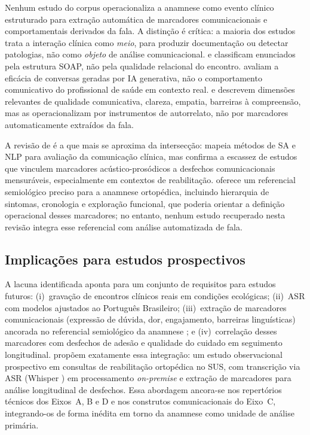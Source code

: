 \documentclass[a4paper,fleqn]{cas-sc}
\begin{document}
Nenhum estudo do corpus operacionaliza a anamnese como evento clínico
estruturado para extração automática de marcadores comunicacionais e
comportamentais derivados da fala.
A distinção é crítica: a maioria dos estudos trata a interação clínica como
\emph{meio}, para produzir documentação ou detectar patologias, não como
\emph{objeto} de análise comunicacional.
\citet{Krishna2021} e
\citet{Schloss2020} classificam enunciados pela
estrutura SOAP, não pela qualidade relacional do encontro.
\citet{Abbasian2024} avaliam a eficácia de
conversas geradas por IA generativa, não o comportamento comunicativo do
profissional de saúde em contexto real.
\citet{Shao2025} e \citet{McCabe2018} descrevem dimensões relevantes de qualidade
comunicativa, clareza, empatia, barreiras à compreensão, mas as
operacionalizam por instrumentos de autorrelato, não por marcadores
automaticamente extraídos da fala.

A revisão de \citet{Albert2024} é a que mais
se aproxima da intersecção: mapeia métodos de SA e NLP para avaliação
da comunicação clínica, mas confirma a escassez de estudos que vinculem
marcadores acústico-prosódicos a desfechos comunicacionais mensuráveis,
especialmente em contextos de reabilitação.
\citet{Porto2019} oferece um referencial semiológico
preciso para a anamnese ortopédica, incluindo hierarquia de sintomas,
cronologia e exploração funcional, que poderia orientar a definição
operacional desses marcadores; no entanto, nenhum estudo recuperado nesta
revisão integra esse referencial com análise automatizada de fala.

\subsection*{Implicações para estudos prospectivos}

A lacuna identificada aponta para um conjunto de requisitos para estudos
futuros: (i)~gravação de encontros clínicos reais em condições ecológicas;
(ii)~ASR com modelos ajustados ao Português Brasileiro;
(iii)~extração de marcadores comunicacionais (expressão de dúvida,
dor, engajamento, barreiras linguísticas) ancorada no referencial
semiológico da anamnese \citep{Porto2019}; e
(iv)~correlação desses marcadores com desfechos de adesão
e qualidade do cuidado em seguimento longitudinal.
\citet{BaenaNeto2026} propõem
exatamente essa integração: um estudo observacional prospectivo em
consultas de reabilitação ortopédica no SUS, com transcrição via ASR
(Whisper \citep{Radford2023}) em processamento \emph{on-premise} e
extração de marcadores para análise longitudinal de desfechos.
Essa abordagem ancora-se nos repertórios técnicos dos Eixos~A, B e D
e nos construtos comunicacionais do Eixo~C, integrando-os de forma inédita
em torno da anamnese como unidade de análise primária.
\end{document}
